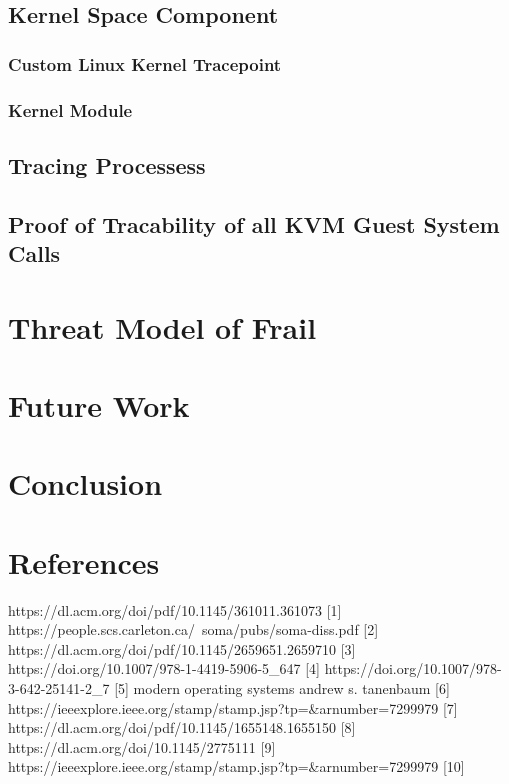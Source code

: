 \documentclass{report}
\begin{document}
\begin{spacing}{1.5}
\section{Kernel Space Component}
\subsection{Custom Linux Kernel Tracepoint}
\subsection{Kernel Module}
\section{Tracing Processess}
\section{Proof of Tracability of all KVM Guest System Calls}

\chapter{Threat Model of Frail}


\chapter{Future Work}

\chapter{Conclusion}

\chapter{References}

{\large
https://dl.acm.org/doi/pdf/10.1145/361011.361073 [1]
https://people.scs.carleton.ca/~soma/pubs/soma-diss.pdf [2]
https://dl.acm.org/doi/pdf/10.1145/2659651.2659710 [3]
https://doi.org/10.1007/978-1-4419-5906-5\_647 [4]
https://doi.org/10.1007/978-3-642-25141-2\_7 [5]
modern operating systems andrew s. tanenbaum [6]
https://ieeexplore.ieee.org/stamp/stamp.jsp?tp=\&arnumber=7299979 [7]
https://dl.acm.org/doi/pdf/10.1145/1655148.1655150 [8]
https://dl.acm.org/doi/10.1145/2775111 [9]
https://ieeexplore.ieee.org/stamp/stamp.jsp?tp=\&arnumber=7299979 [10]
}
\end{spacing}
\end{document}
